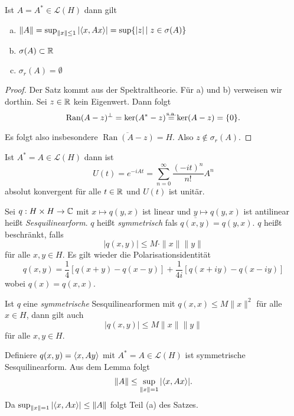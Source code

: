 \documentclass{mycourse}
\newcommand{\Ran}{\operatorname{Ran}}
\begin{document}
\begin{st}
Ist $A=A^*\in \mathcal L(H)$ dann gilt
\begin{enumerate}[a)]
\item $\|A\|=\sup_{\|x\|\le 1} |\langle x, Ax\rangle|= \sup\{|z| \, | \; z\in \sigma(A)\}$
\item $\sigma(A)\subset \mathbb{R}$
\item $\sigma_r(A)=\emptyset$
\end{enumerate}
\end{st}
\begin{proof}
Der Satz kommt aus der Spektraltheorie. Für a) und b) verweisen wir dorthin. Sei $z\in \mathbb{R}$ kein Eigenwert. Dann  folgt
\[
\Ran(A-z)^\perp = \ker(A^*-z)\stack{\text{s.a.}}=\ker(A-z)=\{0\}.
\]
Es folgt also insbesondere $\overline{\Ran(A-z)} = H$. Also $z\not\in \sigma_r(A)$.
\end{proof}
\begin{ex*}
Ist $A^*=A\in \mathcal L(H)$ dann ist
\[
U(t)=e^{-iAt} = \sum_{n=0}^\infty \frac{(-it)^n}{n!} A^n
\]
absolut konvergent für alle $t\in \mathbb{R}$ und $U(t)$ ist unitär.
\end{ex*}
\begin{df}
Sei $q: H\times H \to \mathbb{C}$ mit $x\mapsto q(y,x)$ ist linear und $y\mapsto q(y,x)$ ist antilinear heißt \emph{Sesquilinearform}. $q$ heißt \emph{symmetrisch} fals $\overline{q(x,y)} = q(y,x)$. $q$ heißt beschränkt, falls
\[
|q(x,y)| \le M \cdot \| x \| \| y \|
\]
für alle $x,y\in H$. Es gilt wieder die Polarisationsidentität
\[
q(x,y)= \frac{1}{4} [ q(x+y) - q(x-y) ] + \frac{1}{4i} [ q(x+iy) - q(x-iy)]
\]
wobei $q(x)=q(x,x)$.
\end{df}
\begin{lem}
Ist $q$ eine \emph{symmetrische} Sesquilinearformen mit $q(x,x) \le M \| x\|^2$ für alle $x\in H$, dann gilt auch
\[
|q(x,y)| \le M \| x \| \|y\|
\]
für alle $x,y\in H$.
\end{lem}
\begin{seg}[Anwendung]
Definiere $q(x,y)=\langle x, Ay\rangle$ mit $A^*=A\in \mathcal L(H)$ ist symmetrische Sesquilinearform. Aus dem Lemma folgt
\[
\| A \| \le \sup_{\|x\| =1} |\langle x,Ax\rangle|.
\]
Da $\sup_{\|x\|=1} |\langle x, Ax\rangle| \le \| A\|$ folgt Teil (a) des Satzes.
\end{seg}
\end{document}
